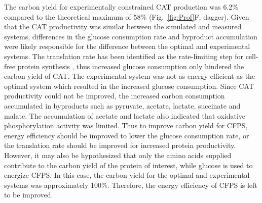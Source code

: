 \documentclass[journal=asbcd6,manuscript=article]{achemso}
\begin{document}
The carbon yield for experimentally constrained CAT production was 6.2\% compared to the theoretical maximum of 58\% (Fig.~\ref{fig:Prof}F, dagger).
Given that the CAT productivity was similar between the simulated and measured systems, differences in
the glucose consumption rate and byproduct accumulation were likely responsible for the difference between the optimal and experimental systems.
The translation rate has been identified as the rate-limiting step for cell-free protein synthesis \cite{2005_underwood_biotech,2014_li_PlosOne}, thus increased glucose consumption only hindered the carbon yield of CAT.
The experimental system was not as energy efficient as the optimal system which resulted in the increased glucose consumption. 
Since CAT productivity could not be improved, the increased carbon consumption accumulated in byproducts such as pyruvate, acetate, lactate, succinate and malate. 
The accumulation of acetate and lactate also indicated that oxidative phosphorylation activity was limited.
Thus to improve carbon yield for CFPS, energy efficiency should be improved to lower the glucose consumption rate, or the translation rate should be improved for increased protein productivity.  
However, it may also be hypothesized that only the amino acids supplied contribute to the carbon yield of the protein of interest, while glucose is used to energize CFPS. 
In this case, the carbon yield for the optimal and experimental systems was approximately 100\%.
Therefore, the energy efficiency of CFPS is left to be improved. 



\end{document}
